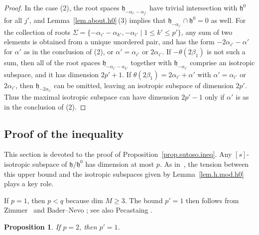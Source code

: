 \documentclass[10pt,a4paper]{amsart}
\numberwithin{equation}{section}
\newtheorem{prop}[thm]{Proposition}
\theoremstyle{definition}
\newcommand{\lieh}{\mathfrak{h}}
\begin{document}
\begin{proof}
In the case (2), the root spaces $\lieh_{- \alpha_{i'} - \alpha_{j'}}$ have trivial intersection with $\lieh^0$ for all $j'$, and Lemma~\ref{lem.about.h0}\,(3) implies that $\lieh_{- \alpha_{i'}} \cap \lieh^0 = 0$ as well. For the collection of roots $ \Sigma = \{ {- \alpha_{i'} - \alpha_{k'}},\allowbreak - \alpha_{i'} \mid 1 \leq k' \leq p' \}$, any sum of two elements is obtained from a unique unordered pair, and has the form $- 2 \alpha_{i'} - \alpha'$ for $\alpha'$ as in the conclusion of (2), or $\alpha' = \alpha_{i'}$ or $2 \alpha_{i'}$. If $- \theta(2 \beta_1) $ is not such a sum, then all of the root spaces $\lieh_{- \alpha_{i'} - \alpha_{k'}}$ together with $\lieh_{- \alpha_{i'}}$ comprise an isotropic subspace, and it has dimension $2 p' +1$. If $\theta(2 \beta_1) = 2 \alpha_{i'} + \alpha'$ with $\alpha' = \alpha_{i'}$ or $2 \alpha_{i'}$, then $\lieh_{- 2 \alpha_{i'}}$ can be omitted, leaving an isotropic subspace of dimension $2p'$. Thus the maximal isotropic subspace can have dimension $2p'-1$ only if $\alpha'$ is as in the conclusion of (2).
\end{proof}

\subsection{Proof of the inequality}\label{subsec.proof.ineq}

This section is devoted to the proof of Proposition~\ref{prop.sutoso.ineq}. Any $[s]$-isotropic subspace of $\lieh/\lieh^0$ has dimension at most $p$.
As in~\cite{pecastaing.rank1},
the tension between this upper bound and the isotropic subspaces given by Lemma~\ref{lem.h.mod.h0} plays a key role.

If $p=1$, then $p < q$ because $\mbox{dim } M \geq 3$.
The bound $p'=1$ then follows from Zimmer~\cite{zimmer.rankbounds} and Bader--Nevo \cite[Theorem~2]{bn.simpleconf}; see also Pecastaing \cite{pecastaing.smooth.sl2r}.

\begin{prop}
If $p=2$, then $p'=1$.
\end{prop}
\end{document}
